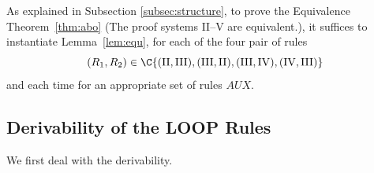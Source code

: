 \documentclass[manuscript, screen, review]{acmart}
\newcommand{\AUX}{\mathit{AUX}}
\begin{document}
As explained in Subsection \ref{subsec:structure}, to prove the
Equivalence Theorem~\ref{thm:abo} (The proof systems II--V are equivalent.),
it suffices to instantiate Lemma~\ref{lem:equ}, 
for each of the four pair of rules
\[
  (R_1, R_2) \in \C{(\mathrm{II}, \mathrm{III}),
    (\mathrm{III},\mathrm{II}),
    (\mathrm{III}, \mathrm{IV}),
    (\mathrm{IV}, \mathrm{III})}
\]
and each time for an appropriate set of rules $\AUX$.


\subsection{Derivability of the LOOP Rules}
\label{subsec:proof-derivability}

We first deal with the derivability.
\end{document}
